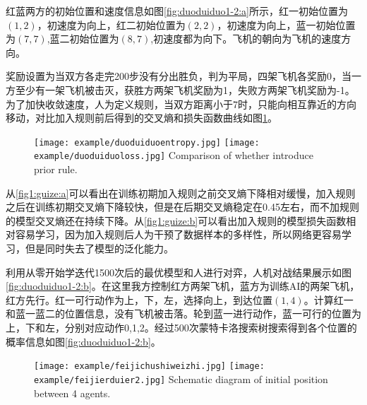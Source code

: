 红蓝两方的初始位置和速度信息如图\ref{fig:duoduiduo1-2:a}所示，红一初始位置为$(1,2)$，初速度为向上，红二初始位置为$(2,2)$，初速度为向上，蓝一初始位置为$(7,7)$,蓝二初始位置为$(8,7)$,初速度都为向下。飞机的朝向为飞机的速度方向。



奖励设置为当双方各走完200步没有分出胜负，判为平局，四架飞机各奖励0，当一方至少有一架飞机被击灭，获胜方两架飞机奖励为1，失败方两架飞机奖励为-1。为了加快收敛速度，人为定义规则，当双方距离小于7时，只能向相互靠近的方向移动，对比加入规则前后得到的交叉熵和损失函数曲线如图\ref{fig1:guize}。
\begin{figure}[hbpt]
	\centering
	{\texttt{[image: example/duoduiduoentropy.jpg]}}
	\hspace{0.5em}
	{\texttt{[image: example/duoduiduoloss.jpg]}}
	{Comparison of whether introduce prior rule.}
	\label{fig1:guize}
\end{figure}

从\ref{fig1:guize:a}可以看出在训练初期加入规则之前交叉熵下降相对缓慢，加入规则之后在训练初期交叉熵下降较快，但是在后期交叉熵稳定在0.45左右，而不加规则的模型交叉熵还在持续下降。从\ref{fig1:guize:b}可以看出加入规则的模型损失函数相对容易学习，因为加入规则后人为干预了数据样本的多样性，所以网络更容易学习，但是同时失去了模型的泛化能力。

利用从零开始学迭代1500次后的最优模型和人进行对弈，人机对战结果展示如图\ref{fig:duoduiduo1-2:b}。在这里我方控制红方两架飞机，蓝方为训练AI的两架飞机，红方先行。红一可行动作为上，下，左，选择向上，到达位置$(1,4)$。计算红一和蓝一蓝二的位置信息，没有飞机被击落。轮到蓝一进行动作，蓝一可行的位置为上，下和左，分别对应动作0,1,2。经过500次蒙特卡洛搜索树搜索得到各个位置的概率信息如图\ref{fig:duoduiduo1-2:b}。

\begin{figure}[htbp]
	\centering
	\subcaptionbox{\label{fig:duoduiduo1-2:a}}
	{\texttt{[image: example/feijichushiweizhi.jpg]}}
	\hspace{0.5em}
	\subcaptionbox{\label{fig:duoduiduo1-2:b}}
	{\texttt{[image: example/feijierduier2.jpg]}}
	{Schematic diagram of initial position between 4 agents.}
	\label{fig:duoduiduo1-2}
\end{figure}


